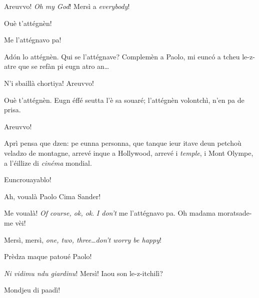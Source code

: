 \begin{drama}
\Cimaspeaks Areuvvo! \textit{Oh my God}! Mersì a \textit{everybody}!

\Conducteurspeaks Ouè t'attégnèn!


\Cimaspeaks Me l'attégnavo pa!


\Conducteurspeaks Ad\'on lo attégnèn. Qui se l'attégnave? Complemèn a Paolo, mi euncó a tcheu le-z-atre que se refàn pi eugn atro an\ldots

\Cimaspeaks{} N'i sbaillà chortiya! Areuvvo!

\Conducteurspeaks Ouè t'attégnèn. Eugn éffé seutta l'è sa souaré; l'attégnèn volontchì, n'en pa de prisa.

\Cimaspeaks{} Areuvvo!

\Conducteurspeaks{} Aprì pensa que dzen: pe eunna personna, que tanque ieur itave deun petchoù veladzo de montagne, arrevé inque a Hollywood, arrevé i \textit{temple}, i Mont Olympe, a l'éillize di \textit{cinéma} mondial.

\Vallettaspeaks Euncrouayablo!

\Conducteurspeaks Ah, voualà Paolo Cima Sander!


\Cimaspeaks{} Me voualà! \textit{Of course, ok, ok}. \textit{I don't} me l'attégnavo pa.  Oh madama moratsade-me vèi!


\Cimaspeaks Mersì, mersì, \textit{one, two, three}\ldots \textit{don't worry be happy}!

\Conducteurspeaks Prèdza maque patoué Paolo!

\Cimaspeaks{} \textit{Ni vidimu ndu giardinu}! Mersì!  Iaou son le-z-itchilì?


\Cimaspeaks{} Mondjeu di paadì!



\end{drama}
